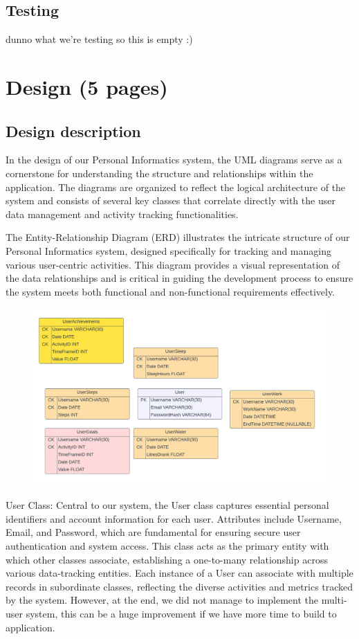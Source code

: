 \documentclass[12pt]{article}
\begin{document}
\subsection{Testing}
dunno what we're testing so this is empty :)

\newpage
\section{Design (5 pages)}
\subsection{Design description}
In the design of our Personal Informatics system, the UML diagrams serve as a cornerstone for understanding the structure and relationships within the application. The diagrams are organized to reflect the logical architecture of the system and consists of several key classes that correlate directly with the user data management and activity tracking functionalities.\par

The Entity-Relationship Diagram (ERD) illustrates the intricate structure of our Personal Informatics system, designed specifically for tracking and managing various user-centric activities. This diagram provides a visual representation of the data relationships and is critical in guiding the development process to ensure the system meets both functional and non-functional requirements effectively.\par

\begin{figure}[h]
\centering
\includegraphics{PI ERD}
\end{figure}

User Class: Central to our system, the User class captures essential personal identifiers and account information for each user. Attributes include Username, Email, and Password, which are fundamental for ensuring secure user authentication and system access. This class acts as the primary entity with which other classes associate, establishing a one-to-many relationship across various data-tracking entities. Each instance of a User can associate with multiple records in subordinate classes, reflecting the diverse activities and metrics tracked by the system. However, at the end, we did not manage to implement the multi-user system, this can be a huge improvement if we have more time to build to application.\par
\end{document}
